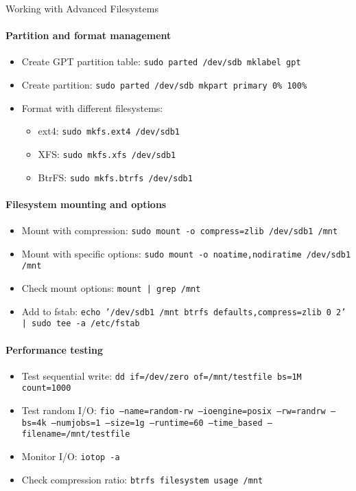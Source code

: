 \begin{KR}{Working with Advanced Filesystems}\\
    \paragraph{Partition and format management}
    \begin{itemize}
        \item Create GPT partition table: \texttt{sudo parted /dev/sdb mklabel gpt}
        \item Create partition: \texttt{sudo parted /dev/sdb mkpart primary 0\% 100\%}
        \item Format with different filesystems:
            \begin{itemize}
                \item ext4: \texttt{sudo mkfs.ext4 /dev/sdb1}
                \item XFS: \texttt{sudo mkfs.xfs /dev/sdb1}
                \item BtrFS: \texttt{sudo mkfs.btrfs /dev/sdb1}
            \end{itemize}
    \end{itemize}
    
    \paragraph{Filesystem mounting and options}
    \begin{itemize}
        \item Mount with compression: \texttt{sudo mount -o compress=zlib /dev/sdb1 /mnt}
        \item Mount with specific options: \texttt{sudo mount -o noatime,nodiratime /dev/sdb1 /mnt}
        \item Check mount options: \texttt{mount | grep /mnt}
        \item Add to fstab: \texttt{echo '/dev/sdb1 /mnt btrfs defaults,compress=zlib 0 2' | sudo tee -a /etc/fstab}
    \end{itemize}
    
    \paragraph{Performance testing}
    \begin{itemize}
        \item Test sequential write: \texttt{dd if=/dev/zero of=/mnt/testfile bs=1M count=1000}
        \item Test random I/O: \texttt{fio --name=random-rw --ioengine=posix --rw=randrw --bs=4k --numjobs=1 --size=1g --runtime=60 --time\_based --filename=/mnt/testfile}
        \item Monitor I/O: \texttt{iotop -a}
        \item Check compression ratio: \texttt{btrfs filesystem usage /mnt}
    \end{itemize}
    

\end{KR}
